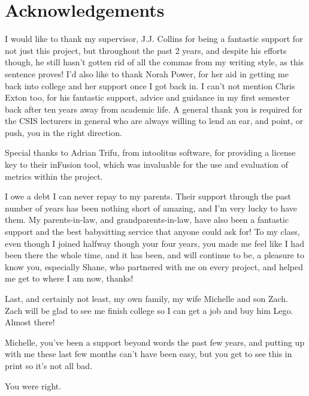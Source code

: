 \section*{Acknowledgements}    

I would like to thank my supervisor, J.J. Collins for being a fantastic support for not just this project, but throughout the past 2 years, and despite his efforts though, he still hasn't gotten rid of all the commas from my writing style, as this sentence proves! I'd also like to thank Norah Power, for her aid in getting me back into college and her support once I got back in. I can't not mention Chris Exton too, for his fantastic support, advice and guidance in my first semester back after ten years away from academic life. A general thank you is required for the CSIS lecturers in general who are always willing to lend an ear, and point, or push, you in the right direction. 

Special thanks to Adrian Trifu, from intoolitus software, for providing a license key to their inFusion tool, which was invaluable for the use and evaluation of metrics within the project. 

I owe a debt I can never repay to my parents. Their support through the past number of years has been nothing short of amazing, and I'm very lucky to have them. My parents-in-law, and grandparents-in-law, have also been a fantastic support and the best babysitting service that anyone could ask for! To my class, even though I joined halfway though your four years, you made me feel like I had been there the whole time, and it has been, and will continue to be, a pleasure to know you, especially Shane, who partnered with me on every project, and helped me get to where I am now, thanks!

Last, and certainly not least, my own family, my wife Michelle and son Zach. Zach will be glad to see me finish college so I can get a job and buy him Lego. Almost there!

Michelle, you've been a support beyond words the past few years, and putting up with me these last few months can't have been easy, but you get to see this in print so it's not all bad. 

You were right.